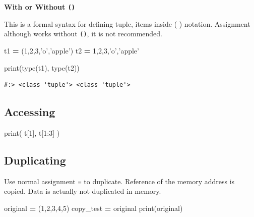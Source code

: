 \documentclass[
]{book}
\newenvironment{Shaded}{\begin{snugshade}}{\end{snugshade}}
\newcommand{\BuiltInTok}[1]{#1}
\newcommand{\DecValTok}[1]{\textcolor[rgb]{0.06,0.06,0.06}{#1}}
\newcommand{\NormalTok}[1]{#1}
\newcommand{\OperatorTok}[1]{\textcolor[rgb]{0.43,0.43,0.43}{\textbf{#1}}}
\newcommand{\StringTok}[1]{\textcolor[rgb]{0.5,0.5,0.5}{#1}}
\begin{document}
\textbf{With or Without \texttt{()} }

This is a formal syntax for defining tuple, items inside ( ) notation. Assignment although works without \texttt{()}, it is not recommended.

\begin{Shaded}
\begin{Highlighting}[]
\NormalTok{t1 }\OperatorTok{=}\NormalTok{ (}\DecValTok{1}\NormalTok{,}\DecValTok{2}\NormalTok{,}\DecValTok{3}\NormalTok{,}\StringTok{'o'}\NormalTok{,}\StringTok{'apple'}\NormalTok{)}
\NormalTok{t2 }\OperatorTok{=} \DecValTok{1}\NormalTok{,}\DecValTok{2}\NormalTok{,}\DecValTok{3}\NormalTok{,}\StringTok{'o'}\NormalTok{,}\StringTok{'apple'}

\BuiltInTok{print}\NormalTok{(}\BuiltInTok{type}\NormalTok{(t1), }\BuiltInTok{type}\NormalTok{(t2))}
\end{Highlighting}
\end{Shaded}

\begin{verbatim}
#:> <class 'tuple'> <class 'tuple'>
\end{verbatim}

\hypertarget{accessing}{%
\subsection{Accessing}\label{accessing}}

\begin{Shaded}
\begin{Highlighting}[]
\BuiltInTok{print}\NormalTok{( t[}\DecValTok{1}\NormalTok{], t[}\DecValTok{1}\NormalTok{:}\DecValTok{3}\NormalTok{] )}
\end{Highlighting}
\end{Shaded}

\hypertarget{duplicating}{%
\subsection{Duplicating}\label{duplicating}}

Use normal assignment \texttt{=} to duplicate. Reference of the memory address is copied. Data is actually not duplicated in memory.

\begin{Shaded}
\begin{Highlighting}[]
\NormalTok{original }\OperatorTok{=}\NormalTok{ (}\DecValTok{1}\NormalTok{,}\DecValTok{2}\NormalTok{,}\DecValTok{3}\NormalTok{,}\DecValTok{4}\NormalTok{,}\DecValTok{5}\NormalTok{)}
\NormalTok{copy_test }\OperatorTok{=}\NormalTok{ original}
\BuiltInTok{print}\NormalTok{(original)}
\end{Highlighting}
\end{Shaded}
\end{document}
